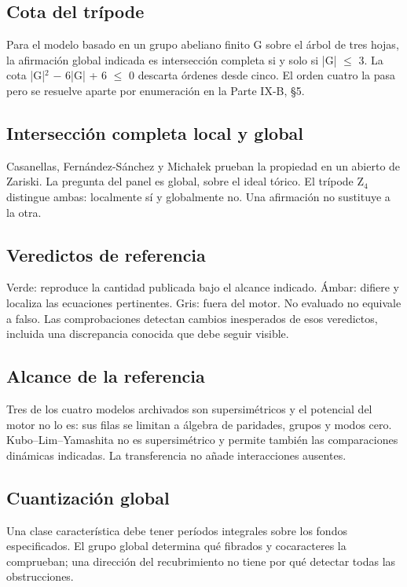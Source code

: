 \documentclass[11pt,a4paper]{article}
\begin{document}
\subsection*{Cota del trípode}
Para el modelo basado en un grupo abeliano finito G sobre el árbol de tres hojas, la afirmación global indicada es intersección completa si y solo si |G| \ensuremath{\leq} 3. La cota |G|\ensuremath{{}^{2}} \ensuremath{-} 6|G| + 6 \ensuremath{\leq} 0 descarta órdenes desde cinco. El orden cuatro la pasa pero se resuelve aparte por enumeración en la Parte IX-B, §5.

\subsection*{Intersección completa local y global}
Casanellas, Fernández-Sánchez y Micha\l{}ek prueban la propiedad en un abierto de Zariski. La pregunta del panel es global, sobre el ideal tórico. El trípode Z\ensuremath{{}_{4}} distingue ambas: localmente sí y globalmente no. Una afirmación no sustituye a la otra.

\subsection*{Veredictos de referencia}
Verde: reproduce la cantidad publicada bajo el alcance indicado. Ámbar: difiere y localiza las ecuaciones pertinentes. Gris: fuera del motor. No evaluado no equivale a falso. Las comprobaciones detectan cambios inesperados de esos veredictos, incluida una discrepancia conocida que debe seguir visible.

\subsection*{Alcance de la referencia}
Tres de los cuatro modelos archivados son supersimétricos y el potencial del motor no lo es: sus filas se limitan a álgebra de paridades, grupos y modos cero. Kubo--Lim--Yamashita no es supersimétrico y permite también las comparaciones dinámicas indicadas. La transferencia no añade interacciones ausentes.

\subsection*{Cuantización global}
Una clase característica debe tener períodos integrales sobre los fondos especificados. El grupo global determina qué fibrados y cocaracteres la comprueban; una dirección del recubrimiento no tiene por qué detectar todas las obstrucciones.
\end{document}
